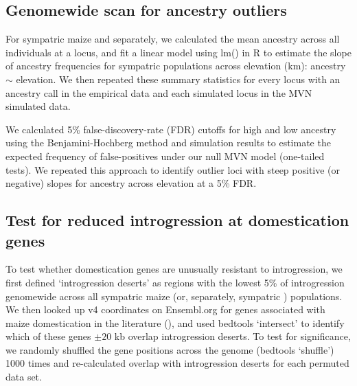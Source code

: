 \subsection*{Genomewide scan for ancestry outliers}

For sympatric maize and \mexicana separately, we calculated the mean \mexicana ancestry across all individuals at a locus, and fit a linear model using lm() in R to estimate the slope of \mexicana ancestry frequencies for sympatric populations across elevation (km): \mexicana ancestry $\sim$ elevation. We then repeated these summary statistics for every locus with an ancestry call in the empirical data and each simulated locus in the MVN simulated data.

We calculated 5\% false-discovery-rate (FDR) cutoffs for high and low \mexicana ancestry using the Benjamini-Hochberg method \cite{Benjamini_Hochberg:1995} and simulation results to estimate the expected frequency of false-positives under our null MVN model (one-tailed tests). 
We repeated this approach to identify outlier loci with steep positive (or negative) slopes for \mexicana ancestry across elevation at a 5\% FDR. 

\subsection*{Test for reduced introgression at domestication genes}

To test whether domestication genes are unusually resistant to introgression, we first defined ‘introgression deserts' as regions with the lowest 5\% of introgression genomewide across all sympatric maize (or, separately, sympatric \mexicana) populations. We then looked up v4 coordinates on Ensembl.org for genes associated with maize domestication in the literature (), and used bedtools ‘intersect' to identify which of these genes $\pm 20$ kb overlap introgression deserts. To test for significance, we randomly shuffled the gene positions across the genome (bedtools ‘shuffle') 1000 times and re-calculated overlap with introgression deserts for each permuted data set.

